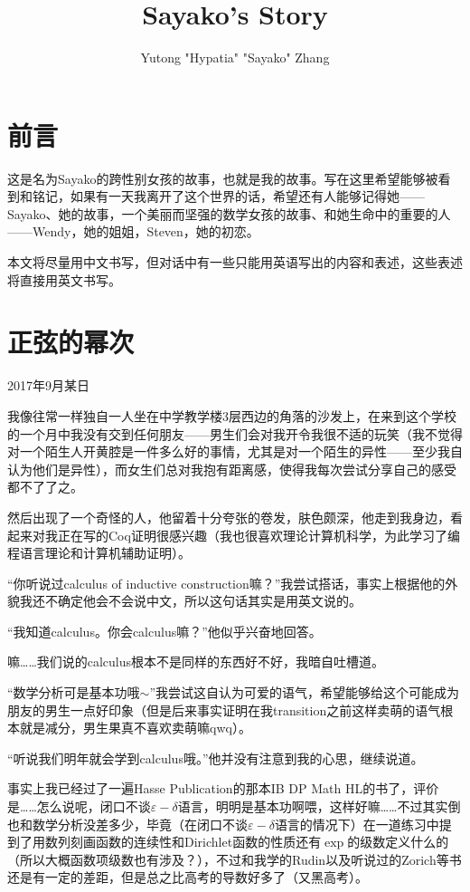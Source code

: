 \documentclass{article}
\title{Sayako's Story}
\author{Yutong "Hypatia" "Sayako" Zhang}
\begin{document}
\maketitle
\setcounter{section}{-1}
\section{前言}
这是名为Sayako的跨性别女孩的故事，也就是我的故事。写在这里希望能够被看到和铭记，如果有一天我离开了这个世界的话，希望还有人能够记得她——Sayako、她的故事，一个美丽而坚强的数学女孩的故事、和她生命中的重要的人——Wendy，她的姐姐，Steven，她的初恋。

本文将尽量用中文书写，但对话中有一些只能用英语写出的内容和表述，这些表述将直接用英文书写。

\section{正弦的幂次}
2017年9月某日

我像往常一样独自一人坐在中学教学楼3层西边的角落的沙发上，在来到这个学校的一个月中我没有交到任何朋友——男生们会对我开令我很不适的玩笑（我不觉得对一个陌生人开黄腔是一件多么好的事情，尤其是对一个陌生的异性——至少我自认为他们是异性），而女生们总对我抱有距离感，使得我每次尝试分享自己的感受都不了了之。

然后出现了一个奇怪的人，他留着十分夸张的卷发，肤色颇深，他走到我身边，看起来对我正在写的Coq证明很感兴趣（我也很喜欢理论计算机科学，为此学习了编程语言理论和计算机辅助证明）。

“你听说过calculus of inductive construction嘛？”我尝试搭话，事实上根据他的外貌我还不确定他会不会说中文，所以这句话其实是用英文说的。

“我知道calculus。你会calculus嘛？”他似乎兴奋地回答。

嘛……我们说的calculus根本不是同样的东西好不好，我暗自吐槽道。

“数学分析可是基本功哦$\sim$”我尝试这自认为可爱的语气，希望能够给这个可能成为朋友的男生一点好印象（但是后来事实证明在我transition之前这样卖萌的语气根本就是减分，男生果真不喜欢卖萌嘛qwq）。

“听说我们明年就会学到calculus哦。”他并没有注意到我的心思，继续说道。

事实上我已经过了一遍Hasse Publication的那本IB DP Math HL的书了，评价是……怎么说呢，闭口不谈$\varepsilon-\delta$语言，明明是基本功啊喂，这样好嘛……不过其实倒也和数学分析没差多少，毕竟（在闭口不谈$\varepsilon-\delta$语言的情况下）在一道练习中提到了用数列刻画函数的连续性和Dirichlet函数的性质还有$\exp$的级数定义什么的（所以大概函数项级数也有涉及？），不过和我学的Rudin以及听说过的Zorich等书还是有一定的差距，但是总之比高考的导数好多了（又黑高考）。
\end{document}
